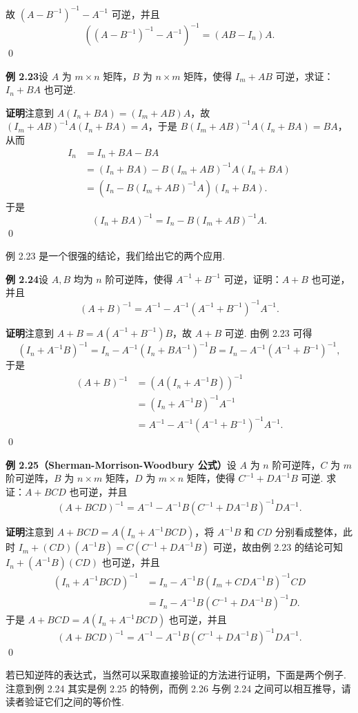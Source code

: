 \documentclass[UTF8,12pt,a4paper,fontset=fandol]{ctexart}
\begin{document}
故 $(A-B^{-1})^{-1}-A^{-1}$ 可逆，并且
\[
\left((A-B^{-1})^{-1}-A^{-1}\right)^{-1}=(AB-I_n)A.
\]
\qed

\noindent\textbf{例 2.23}\quad 设 $A$ 为 $m\times n$ 矩阵，$B$ 为 $n\times m$ 矩阵，使得 $I_m+AB$ 可逆，求证：$I_n+BA$ 也可逆.

\noindent\textbf{证明}\quad 注意到 $A(I_n+BA)=(I_m+AB)A$，故 $(I_m+AB)^{-1}A(I_n+BA)=A$，于是 $B(I_m+AB)^{-1}A(I_n+BA)=BA$，从而
\[
\begin{aligned}
I_n
&=I_n+BA-BA\\
&=(I_n+BA)-B(I_m+AB)^{-1}A(I_n+BA)\\
&=(I_n-B(I_m+AB)^{-1}A)(I_n+BA).
\end{aligned}
\]
于是
\[
(I_n+BA)^{-1}=I_n-B(I_m+AB)^{-1}A.
\]
\qed

例 2.23 是一个很强的结论，我们给出它的两个应用.

\noindent\textbf{例 2.24}\quad 设 $A,B$ 均为 $n$ 阶可逆阵，使得 $A^{-1}+B^{-1}$ 可逆，证明：$A+B$ 也可逆，并且
\[
(A+B)^{-1}=A^{-1}-A^{-1}(A^{-1}+B^{-1})^{-1}A^{-1}.
\]

\noindent\textbf{证明}\quad 注意到 $A+B=A(A^{-1}+B^{-1})B$，故 $A+B$ 可逆. 由例 2.23 可得
\[
(I_n+A^{-1}B)^{-1}
=I_n-A^{-1}(I_n+BA^{-1})^{-1}B
=I_n-A^{-1}(A^{-1}+B^{-1})^{-1},
\]
于是
\[
\begin{aligned}
(A+B)^{-1}
&=(A(I_n+A^{-1}B))^{-1}\\
&=(I_n+A^{-1}B)^{-1}A^{-1}\\
&=A^{-1}-A^{-1}(A^{-1}+B^{-1})^{-1}A^{-1}.
\end{aligned}
\]
\qed

\noindent\textbf{例 2.25（Sherman-Morrison-Woodbury 公式）}\quad 设 $A$ 为 $n$ 阶可逆阵，$C$ 为 $m$ 阶可逆阵，$B$ 为 $n\times m$ 矩阵，$D$ 为 $m\times n$ 矩阵，使得 $C^{-1}+DA^{-1}B$ 可逆. 求证：$A+BCD$ 也可逆，并且
\[
(A+BCD)^{-1}=A^{-1}-A^{-1}B(C^{-1}+DA^{-1}B)^{-1}DA^{-1}.
\]

\noindent\textbf{证明}\quad 注意到 $A+BCD=A(I_n+A^{-1}BCD)$，将 $A^{-1}B$ 和 $CD$ 分别看成整体，此时 $I_m+(CD)(A^{-1}B)=C(C^{-1}+DA^{-1}B)$ 可逆，故由例 2.23 的结论可知 $I_n+(A^{-1}B)(CD)$ 也可逆，并且
\[
\begin{aligned}
(I_n+A^{-1}BCD)^{-1}
&=I_n-A^{-1}B(I_m+CDA^{-1}B)^{-1}CD\\
&=I_n-A^{-1}B(C^{-1}+DA^{-1}B)^{-1}D.
\end{aligned}
\]
于是 $A+BCD=A(I_n+A^{-1}BCD)$ 也可逆，并且
\[
(A+BCD)^{-1}=A^{-1}-A^{-1}B(C^{-1}+DA^{-1}B)^{-1}DA^{-1}.
\]
\qed

若已知逆阵的表达式，当然可以采取直接验证的方法进行证明，下面是两个例子. 注意到例 2.24 其实是例 2.25 的特例，而例 2.26 与例 2.24 之间可以相互推导，请读者验证它们之间的等价性.
\end{document}
